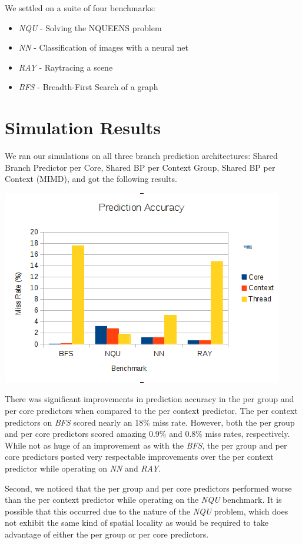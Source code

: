 \documentclass[conference]{IEEEtran}
\begin{document}
We settled on a suite of four benchmarks:

\begin{itemize}
	\item \emph{NQU} - Solving the NQUEENS problem
	\item \emph{NN} - Classification of images with a neural net
	\item \emph{RAY} - Raytracing a scene
	\item \emph{BFS} - Breadth-First Search of a graph
\end{itemize}

\section{Simulation Results}

We ran our simulations on all three branch prediction architectures: Shared Branch Predictor per Core, Shared BP per Context Group, Shared BP per Context (MIMD), and got the following results.

\begin{center}
	\includegraphics[width=.45\textwidth]{data.png}
\end{center}

There was significant improvements in prediction accuracy in the per group and per core predictors when compared to the per context predictor.  The per context predictors on \emph{BFS} scored nearly an 18\% miss rate.  However, both the per group and per core predictors scored amazing 0.9\% and 0.8\% miss rates, respectively.  While not as huge of an improvement as with the \emph{BFS}, the per group and per core predictors posted very respectable improvements over the per context predictor while operating on \emph{NN} and \emph{RAY}.

Second, we noticed that the per group and per core predictors performed worse than the per context predictor while operating on the \emph{NQU} benchmark.  It is possible that this occurred due to the nature of the \emph{NQU} problem, which does not exhibit the same kind of spatial locality as would be required to take advantage of either the per group or per core predictors.
\end{document}
